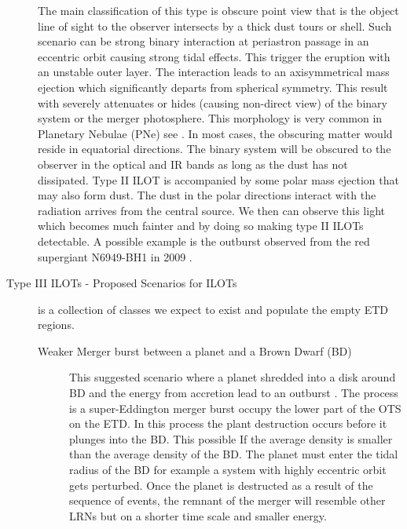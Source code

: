 \documentclass[a4paper,12pt,modern]{aastex62}
\begin{document}
\begin{description}
The main classification of this type is obscure point view that is the object line of sight to the observer intersects by a thick dust tours or shell. Such scenario can be strong binary interaction at periastron passage in an eccentric orbit causing strong tidal effects. This trigger the eruption with an unstable outer layer. The interaction leads to an axisymmetrical mass ejection which significantly departs from spherical symmetry. This result with severely attenuates or hides (causing non-direct view) of the binary system or the merger photosphere. This morphology is very common in Planetary Nebulae (PNe) see \cite{1987AJ.....94..671B,1995A&A...293..871C,1996iacm.book.....M,2016JPhCS.728c2008P,2011apn5.confP..21S}. In most cases, the obscuring matter would reside in equatorial directions. The binary system will be obscured to the observer in the optical and IR bands as long as the dust has not dissipated. Type II ILOT is accompanied by some polar mass ejection that may also form dust.
The dust in the polar directions interact with the radiation arrives from the central source. We then can observe this light which becomes much fainter and by doing so making type II ILOTs detectable. A possible example is the outburst observed from the red supergiant N6949-BH1 in 2009 \cite{2017MNRAS.468.4968A}.

\item[Type III ILOTs - Proposed Scenarios for ILOTs] is a collection of classes we expect to exist and populate the empty ETD regions.
\begin{description} 
\item[Weaker Merger burst between a planet and a Brown Dwarf (BD)] This suggested scenario where a planet shredded into a disk around BD and the energy from accretion lead to an outburst \citep{2011MNRAS.416.1965B}. The process is a super-Eddington merger burst occupy the lower part of the OTS on the ETD. In this process the plant destruction occurs before it plunges into the BD. This possible If the average density is smaller than the average density of the BD. The planet must enter the tidal radius of the BD for example a system with highly eccentric orbit gets perturbed. Once the planet is destructed as a result of the sequence of events, the remnant of the merger will resemble other LRNs but on a shorter time scale and smaller energy.


\end{description}
\end{description}
\end{document}
